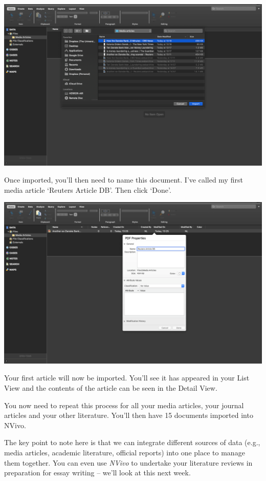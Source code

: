 \documentclass[
]{book}
\begin{document}
\includegraphics{imgs/import_pdf2.png}

Once imported, you'll then need to name this document. I've called my first media article `Reuters Article DB'. Then click `Done'.

\includegraphics{imgs/name_pdf.png}

Your first article will now be imported. You'll see it has appeared in your List View and the contents of the article can be seen in the Detail View.

You now need to repeat this process for all your media articles, your journal articles and your other literature. You'll then have 15 documents imported into NVivo.

The key point to note here is that we can integrate different sources of data (e.g., media articles, academic literature, official reports) into one place to manage them together. You can even use \emph{NVivo} to undertake your literature reviews in preparation for essay writing -- we'll look at this next week.
\end{document}
